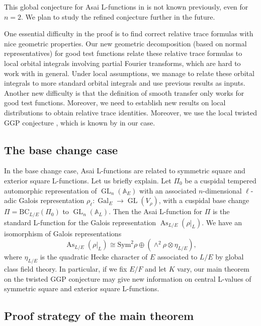 \documentclass[11pt, reqno]{amsart}
\numberwithin{equation}{subsection}
\theoremstyle{plain}
\theoremstyle{definition}
\DeclareMathOperator{\Gal}{Gal}
\DeclareMathOperator{\GL}{GL}
\begin{document}
This global conjecture for Asai L-functions in \cite{TwistedGGP} is not known previously, even for $n=2$. We plan to study the refined conjecture \cite{TwistedGGP} further in the future.

One essential difficulty in the proof is to find correct relative trace formulas with nice geometric properties. Our new geometric decomposition (based on normal representatives) for good test functions relate these relative trace formulas to local orbital integrals involving partial Fourier transforms, which are hard to work with in general. Under local assumptions, we manage to relate these orbital integrals to more standard orbital integrals and use previous results as inputs. Another new difficulty is that the definition of smooth transfer only works for good test functions. Moreover, we need to establish new results on local distributions to obtain relative trace identities. Moreover, we use the local twisted GGP conjecture \cite{TwistedGGP}, which is known by \cite{le2025local} in our case. 




\subsection{The base change case}

In the base change case, Asai L-functions are related to symmetric square and exterior square L-functions. Let us briefly explain. Let $\Pi_0$ be a cuspidal tempered automorphic representation of $\GL_n(\mathbb A_E)$ with an associated $n$-dimensional $\ell$-adic Galois representation $\rho_\ell: \Gal_{E} \to \GL(V_\rho)$, with a cuspidal base change $\Pi=\mathrm{BC}_{L/E}(\Pi_0)$ to $\GL_n(\mathbb A_L)$. Then the Asai L-function for $\Pi$ is the standard L-function for the Galois representation $\operatorname{As}_{L/E}(\rho|_{L})$. We have an isomorphism of Galois representations 
\[
\operatorname{As}_{L/E}(\rho|_{L}) \cong \mathrm{Sym}^2 \rho \oplus (\wedge^2 \rho \otimes \eta_{L/E}),
\]
where $\eta_{L/E}$ is the quadratic Hecke character of $E$ associated to $L/E$ by global class field theory. In particular, if we fix $E/F$ and let $K$ vary, our main theorem on the twisted GGP conjecture may give new information on central L-values of symmetric square and exterior square L-functions.


\subsection{Proof strategy of the main theorem}
\end{document}
